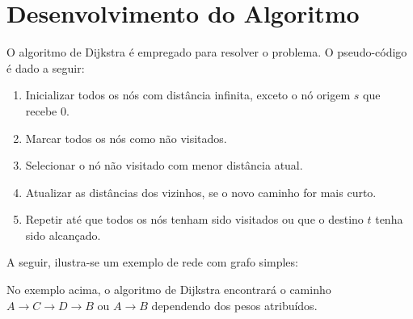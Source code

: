 \section{Desenvolvimento do Algoritmo}\label{sec:figs}

O algoritmo de Dijkstra é empregado para resolver o problema.
O pseudo-código é dado a seguir:

\begin{enumerate}
    \item Inicializar todos os nós com distância infinita, exceto o nó origem $s$ que recebe 0.
    \item Marcar todos os nós como não visitados.
    \item Selecionar o nó não visitado com menor distância atual.
    \item Atualizar as distâncias dos vizinhos, se o novo caminho for mais curto.
    \item Repetir até que todos os nós tenham sido visitados ou que o destino $t$ tenha sido alcançado.
\end{enumerate}

A seguir, ilustra-se um exemplo de rede com grafo simples:

\begin{center}
\end{center}

No exemplo acima, o algoritmo de Dijkstra encontrará o caminho $A \rightarrow C \rightarrow D \rightarrow B$ ou $A \rightarrow B$ dependendo dos pesos atribuídos.
